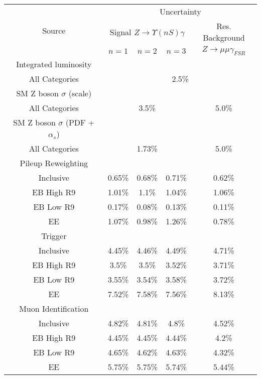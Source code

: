 
\begin{tabular}{c|c|c|c|c}
\cline{1-5}
\multirow{3}{*}{Source} & \multicolumn{4}{c}{Uncertainty} \\
\cline{2-5}
& \multicolumn{3}{c|}{Signal $Z \rightarrow \Upsilon(nS)  \gamma$} & Res. Background   \\
\cline{2-5}
& $n=1$ & $n=2$ & $n=3$ & $Z \rightarrow \mu\mu\gamma_{FSR}$  \\
\hline\hline
Integrated luminosity & \multicolumn{4}{l}{} \\ \hline
All Categories & \multicolumn{4}{c}{2.5\%} \\
\hline\hline
SM Z boson $\sigma$ (scale) & \multicolumn{4}{l}{} \\ \hline
All Categories & \multicolumn{3}{c|}{3.5\%}  & \multicolumn{1}{c}{5.0\%} \\
\hline\hline
SM Z boson $\sigma$ (PDF + $\alpha_s$)  & \multicolumn{4}{l}{} \\ \hline
All Categories & \multicolumn{3}{c|}{1.73\%}  & \multicolumn{1}{c}{5.0\%} \\
\hline\hline
Pileup Reweighting  & \multicolumn{4}{l}{} \\ \hline
Inclusive & 0.65\% & 0.68\% & 0.71\% & 0.62\% \\
EB High R9 & 1.01\% & 1.1\% & 1.04\% & 1.06\% \\
EB Low R9 & 0.17\% & 0.08\% & 0.13\% & 0.11\% \\
EE & 1.07\% & 0.98\% & 1.26\% & 0.78\% \\
\hline\hline
Trigger  & \multicolumn{4}{l}{} \\ \hline
Inclusive & 4.45\% & 4.46\% & 4.49\% & 4.71\% \\
EB High R9 & 3.5\% & 3.5\% & 3.52\% & 3.71\% \\
EB Low R9 & 3.55\% & 3.54\% & 3.58\% & 3.72\% \\
EE & 7.52\% & 7.58\% & 7.56\% & 8.13\% \\
\hline\hline
Muon Identification & \multicolumn{4}{l}{} \\ \hline
Inclusive & 4.82\% & 4.81\% & 4.8\% & 4.52\% \\
EB High R9 & 4.45\% & 4.45\% & 4.44\% & 4.2\% \\
EB Low R9 & 4.65\% & 4.62\% & 4.63\% & 4.32\% \\
EE & 5.75\% & 5.75\% & 5.74\% & 5.44\% \\

\end{tabular}
